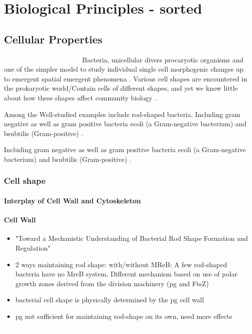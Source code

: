 \documentclass{article}
\newcommand{\todo}[1]{\colorbox{WildStrawberry}{\textcolor{white}{#1}}}
\begin{document}
\section{Biological Principles - sorted}
\subsection{Cellular Properties}

\todo{move this to introduction}
Bacteria, unicellular divers procaryotic organisms and one of the simpler model to study individual single cell morphogenic changes up to emergent spatial emergent phenomena \cite{Vollmer2001}.
Various cell shapes are encountered in the prokaryotic world/Contain cells of different shapes, and yet we know little about how these shapes affect community biology \cite{Smith2017}.

Among the Well-studied examples include rod-shaped bacteria. Including gram negative as well as gram positive bacteria \ac{ecoli} (a Gram-negative bacterium) and \ac{bsubtilis} (Gram-positive) \cite{Chang2014}.

Including gram negative as well as gram positive bacteria \ac{ecoli} (a Gram-negative bacterium) and \ac{bsubtilis} (Gram-positive) \cite{Chang2014}.

\subsubsection{Cell shape}

\paragraph{Interplay of Cell Wall and Cytoskeleton}
\paragraph{Cell Wall}
\begin{itemize}
    \item \cite{Garner2021} "Toward a Mechanistic Understanding of Bacterial Rod Shape Formation and Regulation" \todo{why are we citing this?}
    \item \cite{Daniel2003} 2 ways maintaining rod shape: with/without MReB: A few rod-shaped bacteria have no MreB system.
        Different mechanism based on use of polar growth zones derived from the division machinery (\ac{pg} and FtsZ)
    \item \cite{Amir2014} bacterial cell shape is physically determined by the \ac{pg} cell wall
    \item \ac{pg} not sufficient for maintaining rod-shape on its own, need more effects \todo{do we need more details from this paper?} \todo{@Toqi find citation}
\end{itemize}
\end{document}
